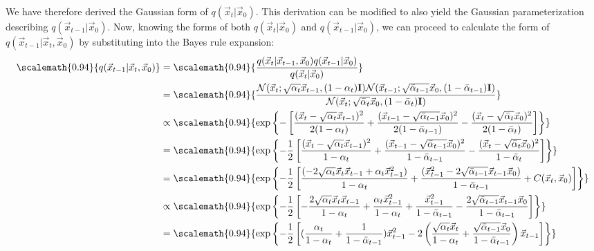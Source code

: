 \newpage
We have therefore derived the Gaussian form of $q(\vec{x}_t|\vec{x}_0)$.  This derivation can be modified to also yield the Gaussian parameterization describing $q(\vec{x}_{t-1}|\vec{x}_0)$.  Now, knowing the forms of both $q(\vec{x}_t|\vec{x}_0)$ and $q(\vec{x}_{t-1}|\vec{x}_0)$, we can proceed to calculate the form of $q(\vec{x}_{t-1}|\vec{x}_t, \vec{x}_0)$ by substituting into the Bayes rule expansion:
\begingroup
\allowdisplaybreaks
\begin{align}
\scalemath{0.94}{q(\vec{x}_{t-1}|\vec{x}_t, \vec{x}_0)}
&= \scalemath{0.94}{\frac{q(\vec{x}_t | \vec{x}_{t-1}, \vec{x}_0)q(\vec{x}_{t-1}|\vec{x}_0)}{q(\vec{x}_{t}|\vec{x}_0)}}\\
&= \scalemath{0.94}{\frac{\mathcal{N}(\vec{x}_{t} ; \sqrt{\alpha_t} \vec{x}_{t-1}, (1 - \alpha_t)\textbf{I})\mathcal{N}(\vec{x}_{t-1} ; \sqrt{\bar\alpha_{t-1}}\vec{x}_0, (1 - \bar\alpha_{t-1}) \textbf{I})}{\mathcal{N}(\vec{x}_{t} ; \sqrt{\bar\alpha_{t}}\vec{x}_0, (1 - \bar\alpha_{t})\textbf{I})}}\\
&\propto \scalemath{0.94}{\text{exp}\left\{-\left[\frac{(\vec{x}_{t} - \sqrt{\alpha_t} \vec{x}_{t-1})^2}{2(1 - \alpha_t)} + \frac{(\vec{x}_{t-1} - \sqrt{\bar\alpha_{t-1}} \vec{x}_0)^2}{2(1 - \bar\alpha_{t-1})} - \frac{(\vec{x}_{t} - \sqrt{\bar\alpha_t} \vec{x}_{0})^2}{2(1 - \bar\alpha_t)} \right]\right\}}\\
&= \scalemath{0.94}{\text{exp}\left\{-\frac{1}{2}\left[\frac{(\vec{x}_{t} - \sqrt{\alpha_t} \vec{x}_{t-1})^2}{1 - \alpha_t} + \frac{(\vec{x}_{t-1} - \sqrt{\bar\alpha_{t-1}} \vec{x}_0)^2}{1 - \bar\alpha_{t-1}} - \frac{(\vec{x}_{t} - \sqrt{\bar\alpha_t} \vec{x}_{0})^2}{1 - \bar\alpha_t} \right]\right\}}\\
&= \scalemath{0.94}{\text{exp}\left\{-\frac{1}{2}\left[\frac{(-2\sqrt{\alpha_t} \vec{x}_{t}\vec{x}_{t-1} + \alpha_t \vec{x}_{t-1}^2)}{1 - \alpha_t} + \frac{(\vec{x}_{t-1}^2 - 2\sqrt{\bar\alpha_{t-1}}\vec{x}_{t-1} \vec{x}_0)}{1 - \bar\alpha_{t-1}} + C(\vec{x}_t, \vec{x}_0)\right]\right\}} \label{eq:73}\\
&\propto \scalemath{0.94}{\text{exp}\left\{-\frac{1}{2}\left[- \frac{2\sqrt{\alpha_t} \vec{x}_{t}\vec{x}_{t-1}}{1 - \alpha_t} + \frac{\alpha_t \vec{x}_{t-1}^2}{1 - \alpha_t} + \frac{\vec{x}_{t-1}^2}{1 - \bar\alpha_{t-1}} - \frac{2\sqrt{\bar\alpha_{t-1}}\vec{x}_{t-1} \vec{x}_0}{1 - \bar\alpha_{t-1}}\right]\right\}}\\
&= \scalemath{0.94}{\text{exp}\left\{-\frac{1}{2}\left[(\frac{\alpha_t}{1 - \alpha_t} + \frac{1}{1 - \bar\alpha_{t-1}})\vec{x}_{t-1}^2 - 2\left(\frac{\sqrt{\alpha_t}\vec{x}_{t}}{1 - \alpha_t} + \frac{\sqrt{\bar\alpha_{t-1}}\vec{x}_0}{1 - \bar\alpha_{t-1}}\right)\vec{x}_{t-1}\right]\right\}}\\

\end{align}
